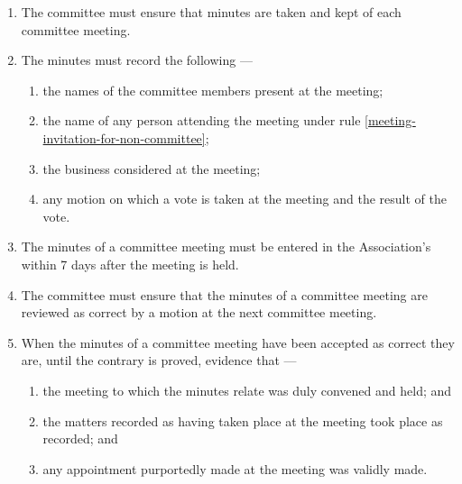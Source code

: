 \documentclass[../constitution.tex]{subfiles}
\begin{document}
\begin{enumerate}

\item The committee must ensure that minutes are taken and kept of each committee meeting.
\item The minutes must record the following ---

  \begin{enumerate}
  
  \item the names of the committee members present at the meeting;
  \item the name of any person attending the meeting under rule \ref{meeting-invitation-for-non-committee};
  \item the business considered at the meeting;
  \item any motion on which a vote is taken at the meeting and the result of the vote.
  \end{enumerate}
\item The minutes of a committee meeting must be entered in the Association's  within 7 days after the meeting is held.
\item The committee must ensure that the minutes of a committee meeting are reviewed  as correct by a motion at the next committee meeting. 
\item When the minutes of a committee meeting have been accepted as correct they are, until the contrary is proved, evidence that ---

  \begin{enumerate}
  
  \item the meeting to which the minutes relate was duly convened and held; and
  \item the matters recorded as having taken place at the meeting took place as recorded; and
  \item any appointment purportedly made at the meeting was validly made.
  \end{enumerate}
\end{enumerate}

\end{document}
